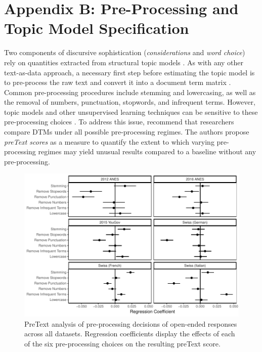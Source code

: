 \clearpage
\section*{Appendix B: Pre-Processing and Topic Model Specification}
\renewcommand\thefigure{B.\arabic{figure}}
\renewcommand\thetable{B.\arabic{table}}
\setcounter{figure}{0}
\setcounter{table}{0}

Two components of discursive sophistication (\textit{considerations} and \textit{word choice}) rely on quantities extracted from structural topic models \citep{roberts2014structural}. As with any other text-as-data approach, a necessary first step before estimating the topic model is to pre-process the raw text and convert it into a document term matrix \citep[DTM, see for example][]{manning2008introduction}. Common pre-processing procedures include stemming and lowercasing, as well as the removal of numbers, punctuation, stopwords, and infrequent terms. However, topic models and other unsupervised learning techniques can be sensitive to these pre-processing choices \citep[c.f.,][]{denny2018text}. To address this issue, \citet{denny2018text} recommend that researchers compare DTMs under all possible pre-processing regimes. The authors propose \textit{preText scores} as a measure to quantify the extent to which varying pre-processing regimes may yield unusual results compared to a baseline without any pre-processing.

\begin{figure}[h]
\centering\includegraphics{../fig/pretext.pdf}
    \caption{PreText analysis of pre-processing decisions of open-ended responses across all datasets. Regression coefficients display the effects of each of the six pre-processing choices on the resulting preText score.}\label{fig:pretext}
\end{figure}

